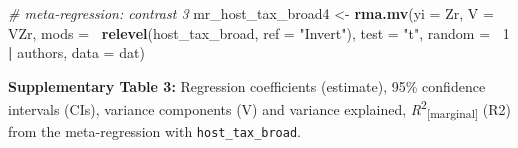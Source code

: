 \documentclass[
]{article}
\newenvironment{Shaded}{\begin{snugshade}}{\end{snugshade}}
\newcommand{\CommentTok}[1]{\textcolor[rgb]{0.56,0.35,0.01}{\textit{#1}}}
\newcommand{\DataTypeTok}[1]{\textcolor[rgb]{0.13,0.29,0.53}{#1}}
\newcommand{\DecValTok}[1]{\textcolor[rgb]{0.00,0.00,0.81}{#1}}
\newcommand{\KeywordTok}[1]{\textcolor[rgb]{0.13,0.29,0.53}{\textbf{#1}}}
\newcommand{\NormalTok}[1]{#1}
\newcommand{\OperatorTok}[1]{\textcolor[rgb]{0.81,0.36,0.00}{\textbf{#1}}}
\newcommand{\StringTok}[1]{\textcolor[rgb]{0.31,0.60,0.02}{#1}}
\begin{document}
\begin{Shaded}
\begin{Highlighting}[]
\CommentTok{# meta-regression: contrast 3}
\NormalTok{mr_host_tax_broad4 <-}\StringTok{ }\KeywordTok{rma.mv}\NormalTok{(}\DataTypeTok{yi =}\NormalTok{ Zr, }\DataTypeTok{V =}\NormalTok{ VZr, }\DataTypeTok{mods =} \OperatorTok{~}\KeywordTok{relevel}\NormalTok{(host_tax_broad, }\DataTypeTok{ref =} \StringTok{"Invert"}\NormalTok{), }
    \DataTypeTok{test =} \StringTok{"t"}\NormalTok{, }\DataTypeTok{random =} \OperatorTok{~}\DecValTok{1} \OperatorTok{|}\StringTok{ }\NormalTok{authors, }\DataTypeTok{data =}\NormalTok{ dat)}
\end{Highlighting}
\end{Shaded}

\textbf{Supplementary Table 3:} Regression coefficients (estimate), 95\%
confidence intervals (CIs), variance components (V) and variance
explained, \emph{R}\textsuperscript{2}\textsubscript{{[}marginal{]}}
(R2) from the meta-regression with \texttt{host\_tax\_broad}.
\end{document}
